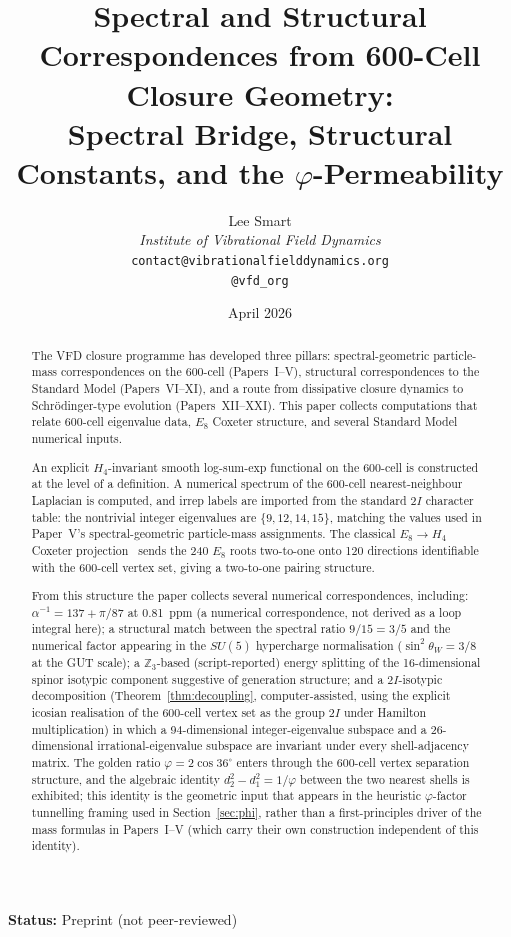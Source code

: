 \documentclass[12pt]{article}
\title{Spectral and Structural Correspondences from 600-Cell Closure Geometry:\\[6pt]
\large Spectral Bridge, Structural Constants, and the $\varphi$-Permeability}
\author{%
  Lee Smart\\[4pt]
  \textit{Institute of Vibrational Field Dynamics}\\[2pt]
  \texttt{contact@vibrationalfielddynamics.org}\\[2pt]
  \texttt{@vfd\_org}%
}
\date{April 2026}
\begin{document}
\maketitle

\noindent\textbf{Status:} Preprint (not peer-reviewed)

\begin{abstract}
The VFD closure programme has developed three pillars: spectral-geometric particle-mass correspondences on the 600-cell (Papers~I--V), structural correspondences to the Standard Model (Papers~VI--XI), and a route from dissipative closure dynamics to Schr\"odinger-type evolution (Papers~XII--XXI). This paper collects computations that relate 600-cell eigenvalue data, $E_8$ Coxeter structure, and several Standard Model numerical inputs.

An explicit $H_4$-invariant smooth log-sum-exp functional on the 600-cell is constructed at the level of a definition. A numerical spectrum of the 600-cell nearest-neighbour Laplacian is computed, and irrep labels are imported from the standard $2I$ character table: the nontrivial integer eigenvalues are $\{9, 12, 14, 15\}$, matching the values used in Paper~V's spectral-geometric particle-mass assignments. The classical $E_8 \to H_4$ Coxeter projection~\citep{Koca2007, MoodyPatera1993, CascadeAlgSubstrate} sends the 240 $E_8$ roots two-to-one onto 120 directions identifiable with the 600-cell vertex set, giving a two-to-one pairing structure.

From this structure the paper collects several numerical correspondences, including: $\alpha^{-1} = 137 + \pi/87$ at 0.81~ppm (a numerical correspondence, not derived as a loop integral here); a structural match between the spectral ratio $9/15 = 3/5$ and the numerical factor appearing in the $SU(5)$ hypercharge normalisation ($\sin^2\theta_W = 3/8$ at the GUT scale); a $\mathbb{Z}_3$-based (script-reported) energy splitting of the 16-dimensional spinor isotypic component suggestive of generation structure; and a $2I$-isotypic decomposition (Theorem~\ref{thm:decoupling}, computer-assisted, using the explicit icosian realisation of the 600-cell vertex set as the group $2I$ under Hamilton multiplication) in which a 94-dimensional integer-eigenvalue subspace and a 26-dimensional irrational-eigenvalue subspace are invariant under every shell-adjacency matrix. The golden ratio $\varphi = 2\cos 36^\circ$ enters through the 600-cell vertex separation structure, and the algebraic identity $d_2^2 - d_1^2 = 1/\varphi$ between the two nearest shells is exhibited; this identity is the geometric input that appears in the heuristic $\varphi$-factor tunnelling framing used in Section~\ref{sec:phi}, rather than a first-principles driver of the mass formulas in Papers~I--V (which carry their own construction independent of this identity).


\end{abstract}
\end{document}
